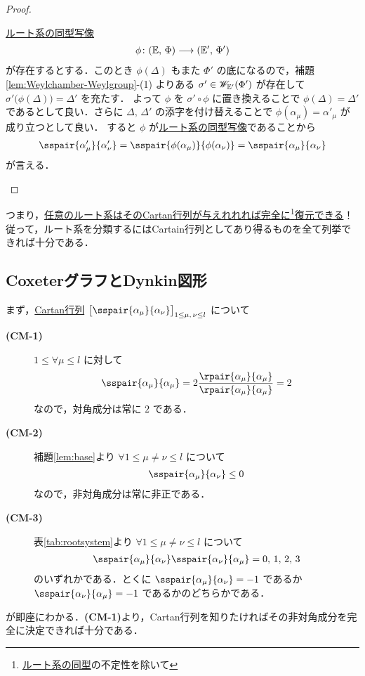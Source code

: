\documentclass[rep_main]{subfiles}
\begin{document}
\begin{proof}
\begin{description}
		\hyperref[def:isom-root]{ルート系の同型写像}
		\begin{align}
			\phi \colon (\mathbb{E},\, \Phi) \longrightarrow (\mathbb{E}',\, \Phi')
		\end{align}
		が存在するとする．このとき $\phi(\Delta)$ もまた $\Phi'$ の底になるので，補題\ref{lem:Weylchamber-Weylgroup}-(1) よりある $\sigma' \in \mathscr{W}_{\mathbb{E}'}(\Phi')$ が存在して $\sigma' \bigl( \phi(\Delta)\bigr) = \Delta'$ を充たす．
		よって $\phi$ を $\sigma' \circ \phi$ に置き換えることで $\phi(\Delta) = \Delta'$ であるとして良い．さらに $\Delta,\, \Delta'$ の添字を付け替えることで $\phi (\alpha_\mu) = \alpha'_\mu$ が成り立つとして良い．
		すると $\phi$ が\hyperref[def:isom-root]{ルート系の同型写像}であることから
		\begin{align}
			\sspair{\alpha'_\mu}{\alpha'_\nu} = \sspair{\phi(\alpha_\mu)}{\phi(\alpha_\nu)} = \sspair{\alpha_\mu}{\alpha_\nu}
		\end{align}
		が言える．
	\end{description}
\end{proof}

つまり，\underline{任意の\hyperref[ax:root-system]{ルート系}はその\hyperref[def:Cartan-matrix]{Cartan行列}が与えれれれば完全に\footnote{\hyperref[def:isom-root]{ルート系の同型}の不定性を除いて}復元できる}！
従って，ルート系を分類するにはCartain行列としてあり得るものを全て列挙できれば十分である．

\subsection{CoxeterグラフとDynkin図形}

まず，\hyperref[def:Cartan-matrix]{Cartan行列} $\bigl[ \sspair{\alpha_\mu}{\alpha_\nu} \bigr]_{1 \le \mu,\, \nu \le l}$ について
\begin{description}
	\item[\textbf{(CM-1)}] \label{Cartan-matrix-classification}
	$1 \le \forall \mu \le l$ に対して
	\begin{align}
		\sspair{\alpha_\mu}{\alpha_\mu} = 2\frac{\rpair{\alpha_\mu}{\alpha_\mu}}{\rpair{\alpha_\mu}{\alpha_\mu}} = 2
	\end{align}
	なので，対角成分は常に $2$ である．
	\item[\textbf{(CM-2)}] 補題\ref{lem:base}より $\forall 1 \le \mu \neq \nu \le l$ について
	\begin{align}
		\sspair{\alpha_\mu}{\alpha_\nu} \le 0
	\end{align}
	なので，非対角成分は常に非正である．
	\item[\textbf{(CM-3)}] 表\ref{tab:rootsystem}より $\forall 1 \le \mu \neq \nu \le l$ について
	\begin{align}
		\sspair{\alpha_\mu}{\alpha_\nu}\sspair{\alpha_\nu}{\alpha_\mu} = 0,\, 1,\, 2,\, 3
	\end{align}
	のいずれかである．とくに $\sspair{\alpha_\mu}{\alpha_\nu} = -1$ であるか $\sspair{\alpha_\nu}{\alpha_\mu} = -1$ であるかのどちらかである．
\end{description}
が即座にわかる．\textsf{\textbf{(CM-1)}}より，Cartan行列を知りたければその非対角成分を完全に決定できれば十分である．
\end{document}
